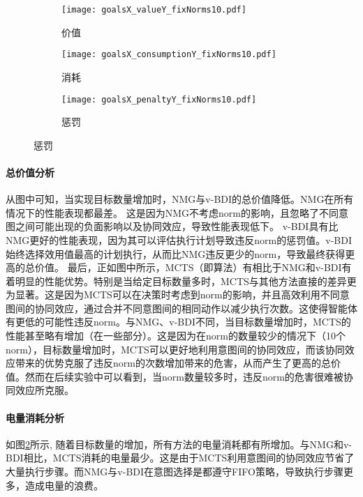 \begin{figure}
\centering
\begin{subfigure}{.47\textwidth}
  \centering
  \texttt{[image: goalsX\_valueY\_fixNorms10.pdf]}
  \captionsetup{justification=centering}
  \caption{价值}
  \label{fig:goalsX_valueY_fixNorms10}
\end{subfigure}

\begin{subfigure}{.47\textwidth}
  \centering
  \texttt{[image: goalsX\_consumptionY\_fixNorms10.pdf]}
  \captionsetup{justification=centering}
  \caption{消耗}
  \label{fig:goalsX_consumptionY_fixNorms10}
\end{subfigure}
\begin{subfigure}{.47\textwidth}
  \centering
  \texttt{[image: goalsX\_penaltyY\_fixNorms10.pdf]}
  \captionsetup{justification=centering}
  \caption{惩罚}
  \label{fig:goalsX_penaltyY_fixNorms10}
\end{subfigure}
\captionsetup{justification=centering}
\label{fig:all_fixNorms10}
\end{figure}

\paragraph{总价值分析}
从图中可知，当实现目标数量增加时，NMG与v-BDI的总价值降低。NMG在所有情况下的性能表现都最差。
这是因为NMG不考虑norm的影响，且忽略了不同意图之间可能出现的负面影响以及协同效应，导致性能表现低下。
v-BDI具有比NMG更好的性能表现，因为其可以评估执行计划导致违反norm的惩罚值。v-BDI始终选择效用值最高的计划执行，从而比NMG违反更少的norm，导致最终获得更高的总价值。
最后，正如图中所示，MCTS（即\SAN 算法）有相比于NMG和v-BDI有着明显的性能优势。特别是当给定目标数量多时，MCTS与其他方法直接的差异更为显著。这是因为MCTS可以在决策时考虑到norm的影响，并且高效利用不同意图间的协同效应，通过合并不同意图间的相同动作以减少执行次数。这使得智能体有更低的可能性违反norm。与NMG、v-BDI不同，当目标数量增加时，MCTS的性能甚至略有增加（在一些部分）。这是因为在norm的数量较少的情况下（10个norm），目标数量增加时，MCTS可以更好地利用意图间的协同效应，而该协同效应带来的优势克服了违反norm的次数增加带来的危害，从而产生了更高的总价值。然而在后续实验中可以看到，当norm数量较多时，违反norm的危害很难被协同效应所克服。

\paragraph{电量消耗分析}
如图\ref{fig:goalsX_consumptionY_fixNorms10}所示, 随着目标数量的增加，所有方法的电量消耗都有所增加。与NMG和v-BDI相比，MCTS消耗的电量最少。这是由于MCTS利用意图间的协同效应节省了大量执行步骤。而NMG与v-BDI在意图选择是都遵守FIFO策略，导致执行步骤更多，造成电量的浪费。
